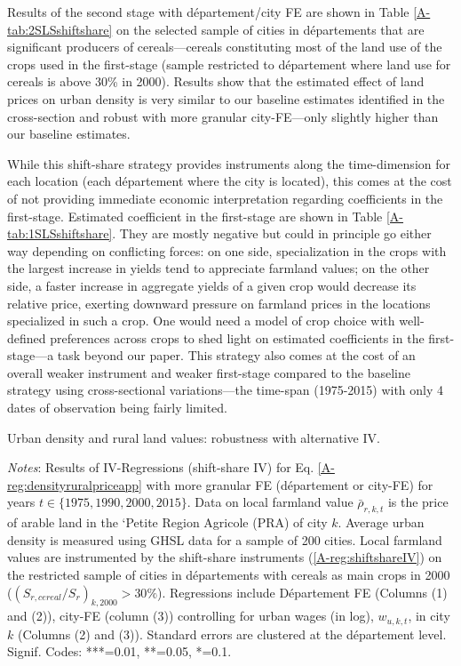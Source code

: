 \documentclass[11pt]{report}
\newcommand{\datatables}{../output/data/tables}
\begin{document}
Results of the second stage with département/city FE are shown in Table \ref{A-tab:2SLSshiftshare} on the selected sample of cities in départements that are significant producers of cereals---cereals constituting most of the land use of the crops used in the first-stage (sample restricted to département where land use for cereals is above 30\% in 2000). Results show that the estimated effect of land prices on urban density is very similar to our baseline estimates identified in the cross-section and robust with more granular city-FE---only slightly higher than our baseline estimates.



While this shift-share strategy provides instruments along the time-dimension for each location (each département where the city is located), this comes at the cost of not providing immediate economic interpretation regarding coefficients in the first-stage. Estimated coefficient in the first-stage are shown in Table \ref{A-tab:1SLSshiftshare}. They are mostly negative but could in principle go either way depending on conflicting forces: on one side, specialization in the crops with the largest increase in yields tend to appreciate farmland values; on the other side, a faster increase in aggregate yields of a given crop would decrease its relative price, exerting downward pressure on farmland prices in the locations specialized in such a crop. One would need a model of crop choice with well-defined preferences across crops to shed light on estimated coefficients in the first-stage---a task beyond our paper. This strategy also comes at the cost of an overall weaker instrument and weaker first-stage compared to the baseline strategy using cross-sectional variations---the time-span (1975-2015) with only 4 dates of observation being fairly limited.

% 

\begin{table}[h!]
	\begin{center}
		
		\caption{Urban density and rural land values: robustness with alternative IV.\label{A-tab:2SLSshiftshare}}
	\end{center}
	{\footnotesize \textit{Notes}: Results of IV-Regressions (shift-share IV) for Eq. \ref{A-reg:densityruralpriceapp} with more granular FE (département or city-FE) for years $t \in \{1975, 1990, 2000, 2015\}$. Data on local farmland value $\bar{\rho}_{r,k,t}$ is the price of arable land in the `Petite Region Agricole (PRA) of city $k$.  Average urban density is measured using GHSL data for a sample of 200 cities. Local farmland values are instrumented by the shift-share instruments (\ref{A-reg:shiftshareIV}) on the restricted sample of cities in départements with cereals as main crops in 2000 ($(S_{r,cereal}/S_r)_{k,2000}>30\%$). Regressions include Département FE (Columns (1) and (2)), city-FE (column (3))  controlling for urban wages (in log), $w_{u,k,t}$, in city $k$ (Columns (2) and (3)). Standard errors are clustered at the département level. Signif. Codes: ***=0.01, **=0.05, *=0.1.}
\end{table}
\end{document}
